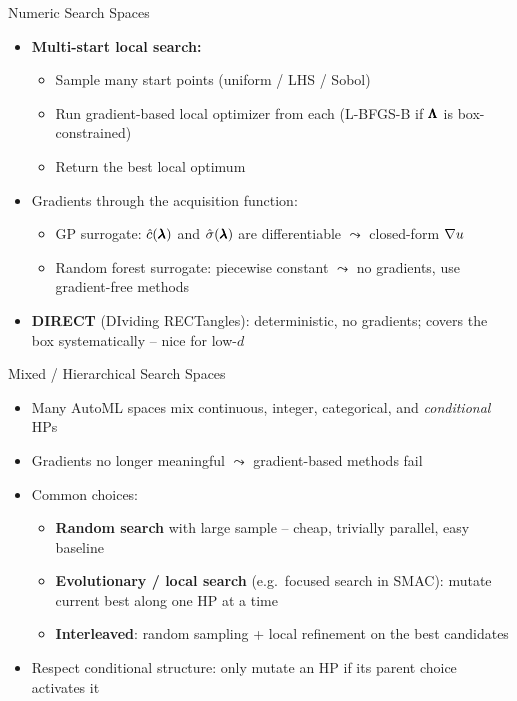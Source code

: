 \documentclass[main]{subfiles}
\begin{document}
\begin{frame}[t]{Numeric Search Spaces}
  \begin{itemize}
    \item \textbf{Multi-start local search:}
        \begin{itemize}
            \item Sample many start points (uniform / LHS / Sobol)
            \item Run gradient-based local optimizer from each (L-BFGS-B if $\pmb{\Lambda}$ is box-constrained)
            \item Return the best local optimum
        \end{itemize}
    \item Gradients through the acquisition function:
        \begin{itemize}
            \item GP surrogate: $\hat{c}(\pmb{\lambda})$ and $\hat{\sigma}(\pmb{\lambda})$ are differentiable $\leadsto$ closed-form $\nabla u$
            \item Random forest surrogate: piecewise constant $\leadsto$ no gradients, use gradient-free methods
        \end{itemize}
    \item \textbf{DIRECT} (DIviding RECTangles): deterministic, no gradients; covers the box systematically -- nice for low-$d$
  \end{itemize}
\end{frame}


\begin{frame}[t]{Mixed / Hierarchical Search Spaces}
  \begin{itemize}
    \item Many AutoML spaces mix continuous, integer, categorical, and \emph{conditional} HPs
    \item Gradients no longer meaningful $\leadsto$ gradient-based methods fail
    \item Common choices:
        \begin{itemize}
            \item \textbf{Random search} with large sample -- cheap, trivially parallel, easy baseline
            \item \textbf{Evolutionary / local search} (e.g.\ focused search in SMAC): mutate current best along one HP at a time
            \item \textbf{Interleaved}: random sampling + local refinement on the best candidates
        \end{itemize}
    \item Respect conditional structure: only mutate an HP if its parent choice activates it
  \end{itemize}
\end{frame}
\end{document}
